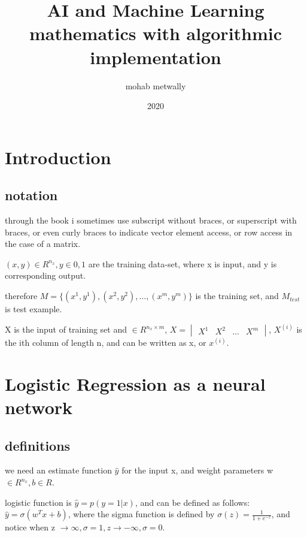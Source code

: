 \documentclass[4apaper,12pt]{book}
\begin{document}
\title{AI and Machine Learning mathematics  with algorithmic implementation}
\author{mohab metwally}
\date{2020}

\maketitle
\tableofcontents

\chapter*{Introduction}

\section{notation}
\begin{description}
  \item through the book i sometimes use subscript without braces, or superscript with braces, or even curly braces to indicate vector element access, or row access in the case of a matrix.
\item $(x, y) \in R^{n_x}, y \in {0,1}$ are the training data-set, where x is input,  and y is corresponding output.
\item therefore $M=\{(x^1, y^1), (x^2, y^2), ..., (x^{m}, y^{m})\}$  is the training set, and $M_{test}$ is test example.
\item X is the input of training set and $\in R^{n_x \times m}$, $X=\begin{vmatrix}X^1&X^2&...&X^{m}\end{vmatrix}$, $X^{(i)}$ is the ith column of length n, and can be written as x, or $x^{(i)}$.
\end{description}

\chapter{Logistic Regression as a neural network}

\section{definitions}

\begin{description}
\item we need an estimate function $\hat{y}$ for the input x, and weight parameters w$\in R^{n_x}, b\in R$.
\item logistic function is $\hat{y}=p(y=1|x)$, and can be defined as follows: $\hat{y}=\sigma(w^Tx+b)$, where the sigma function is defined by $\sigma(z)=\frac{1}{1+e^{-z}}$, and notice when z $\to \infty, \sigma = 1, z \to -\infty, \sigma =0$.
\item
\end{description}
\end{document}
